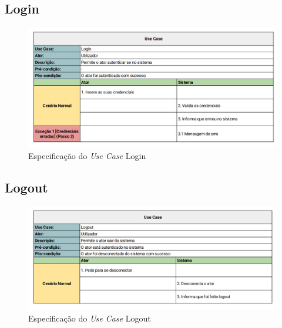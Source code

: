 \documentclass[a4paper]{report}
\begin{document}
\subsection{Login}
\begin{figure}[H]
	\centering 
    \includegraphics[width=\textwidth]{images/Login.png}  
	\caption{Especificação do \emph{Use Case} Login}
\end{figure}

\subsection{Logout}
\begin{figure}[H]
	\centering 
    \includegraphics[width=\textwidth]{images/Logout.png}  
    \caption{Especificação do \emph{Use Case} Logout}
\end{figure}
\end{document}
